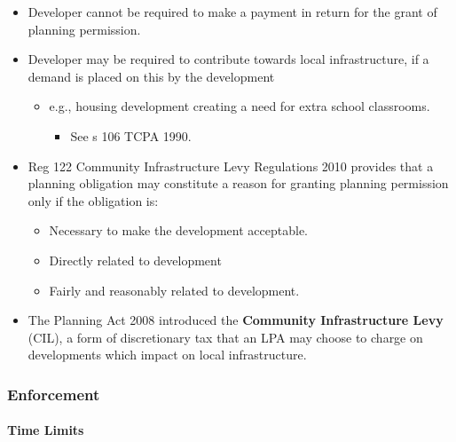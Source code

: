 \documentclass[
]{article}
\providecommand{\tightlist}{%
  \setlength{\itemsep}{0pt}\setlength{\parskip}{0pt}}
\begin{document}
\begin{itemize}
\tightlist
\item
  Developer cannot be required to make a payment in return for the grant
  of planning permission.
\item
  Developer may be required to contribute towards local infrastructure,
  if a demand is placed on this by the development

  \begin{itemize}
  \tightlist
  \item
    e.g., housing development creating a need for extra school
    classrooms.

    \begin{itemize}
    \tightlist
    \item
      See s 106 TCPA 1990.
    \end{itemize}
  \end{itemize}
\item
  Reg 122 Community Infrastructure Levy Regulations 2010 provides that a
  planning obligation may constitute a reason for granting planning
  permission only if the obligation is:

  \begin{itemize}
  \tightlist
  \item
    Necessary to make the development acceptable.
  \item
    Directly related to development
  \item
    Fairly and reasonably related to development.
  \end{itemize}
\item
  The Planning Act 2008 introduced the \textbf{Community Infrastructure
  Levy} (CIL), a form of discretionary tax that an LPA may choose to
  charge on developments which impact on local infrastructure.
\end{itemize}

\hypertarget{enforcement}{%
\subsubsection{Enforcement}\label{enforcement}}

\hypertarget{time-limits}{%
\paragraph{Time Limits}\label{time-limits}}
\end{document}
